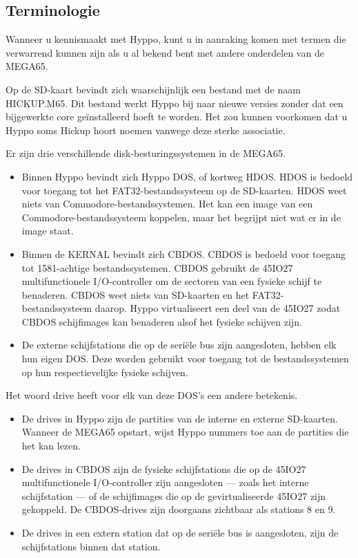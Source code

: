 \subsection{Terminologie}

Wanneer u kennismaakt met Hyppo, kunt u in aanraking komen met termen die verwarrend kunnen zijn als u al bekend bent met andere onderdelen van de MEGA65.

Op de SD-kaart bevindt zich waarschijnlijk een bestand met de naam HICKUP.M65. Dit bestand werkt Hyppo bij naar nieuwe versies zonder dat een bijgewerkte core geïnstalleerd hoeft te worden. Het zou kunnen voorkomen dat u Hyppo soms Hickup hoort noemen vanwege deze sterke associatie.

Er zijn drie verschillende disk-besturingssystemen in de MEGA65.

\begin{itemize}
  
\item Binnen Hyppo bevindt zich Hyppo DOS, of kortweg HDOS. HDOS is bedoeld voor toegang tot het FAT32-bestandssysteem op de SD-kaarten. HDOS weet niets van Commodore-bestandssystemen. Het kan een image van een Commodore-bestandssysteem koppelen, maar het begrijpt niet wat er in de image staat.  
\item Binnen de KERNAL bevindt zich CBDOS. CBDOS is bedoeld voor toegang tot 1581-achtige bestandssystemen. CBDOS gebruikt de 45IO27 multifunctionele I/O-controller om de sectoren van een fysieke schijf te benaderen. CBDOS weet niets van SD-kaarten en het FAT32-bestandssysteem daarop. Hyppo virtualiseert een deel van de 45IO27 zodat CBDOS schijfimages kan benaderen alsof het fysieke schijven zijn.  
\item De externe schijfstations die op de seriële bus zijn aangesloten, hebben elk hun eigen DOS. Deze worden gebruikt voor toegang tot de bestandssystemen op hun respectievelijke fysieke schijven.
\end{itemize}

Het woord drive heeft voor elk van deze DOS's een andere betekenis.

\begin{itemize}
  
\item De drives in Hyppo zijn de partities van de interne en externe SD-kaarten. Wanneer de MEGA65 opstart, wijst Hyppo nummers toe aan de partities die het kan lezen.  
\item De drives in CBDOS zijn de fysieke schijfstations die op de 45IO27 multifunctionele I/O-controller zijn aangesloten --- zoals het interne schijfstation --- of de schijfimages die op de gevirtualiseerde 45IO27 zijn gekoppeld. De CBDOS-drives zijn doorgaans zichtbaar als stations 8 en 9.  
\item De drives in een extern station dat op de seriële bus is aangesloten, zijn de schijfstations binnen dat station.
\end{itemize}

